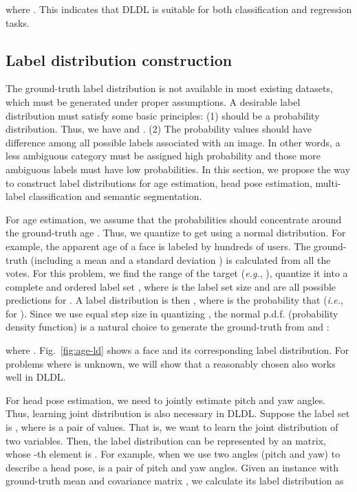 \documentclass[journal]{IEEEtran}
\begin{document}
where . This indicates that DLDL is suitable for both classification and regression tasks.

\subsection{Label distribution construction} \label{sec:ldc}
The ground-truth label distribution  is not available in most existing datasets, which must be generated under proper assumptions. A desirable label distribution  must satisfy some basic principles: (1)  should be a probability distribution. Thus, we have  and . (2) The probability values  should have difference among all possible labels associated with an image. In other words, a less ambiguous category must be assigned high probability and those more ambiguous labels must have low probabilities. In this section, we propose the way to construct label distributions for age estimation, head pose estimation, multi-label classification and semantic segmentation.

For age estimation, we assume that the probabilities should concentrate around the ground-truth age . Thus, we quantize  to get  using a normal distribution. For example, the apparent age of a face is labeled by hundreds of users. The ground-truth (including a mean  and a standard deviation ) is calculated from all the votes. For this problem, we find the range of the target  (\emph{e.g.}, ), quantize it into a complete and ordered label set , where  is the label set size and  are all possible predictions for . A label distribution  is then , where  is the probability that  (\emph{i.e.},  for ). Since we use equal step size in quantizing , the normal p.d.f. (probability density function) is a natural choice to generate the ground-truth  from  and :

where
.
Fig.~\ref{fig:age-ld} shows a face and its corresponding label distribution. For problems where  is unknown, we will show that a reasonably chosen  also works well in DLDL.

For head pose estimation, we need to jointly estimate pitch and yaw angles. Thus, learning joint distribution is also necessary in DLDL. Suppose the label set is , where  is a pair of values. That is, we want to learn the joint distribution of two variables. Then, the label distribution  can be represented by an  matrix, whose -th element is . For example, when we use two angles (pitch and yaw) to describe a head pose,  is a pair of pitch and yaw angles. Given an instance  with ground-truth mean  and covariance matrix , we calculate its label distribution as
\end{document}
